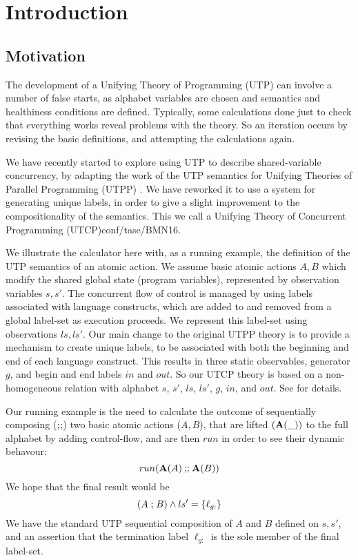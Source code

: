 \section{Introduction}\label{sec:Intro}

\subsection{Motivation}

The development of a Unifying Theory of Programming (UTP)
can involve a number of false starts,
as alphabet variables are chosen
and semantics and healthiness conditions are defined.
Typically, some calculations done just to check that everything
works reveal problems with the theory.
So an iteration occurs by revising the basic definitions,
and attempting the calculations again.

We have recently started to explore using UTP
to describe shared-variable concurrency,
by adapting the work of the  UTP semantics for Unifying Theories
of Parallel Programming (UTPP) \cite{DBLP:conf/icfem/WoodcockH02}.
We have reworked it to use a system for generating unique labels,
in order to give a slight improvement to the compositionality
of the semantics. This we call a Unifying Theory of Concurrent Programming (UTCP){conf/tase/BMN16}.

We illustrate the calculator here
with, as a running example,
the definition of the UTP semantics of an atomic action.
We assume basic atomic actions $A,B$ which modify the
shared global state (program variables), represented by observation variables $s,s'$.
The concurrent flow of control is managed by using labels
associated with language constructs, which are added to and removed
from a global label-set as execution proceeds.
We represent this label-set using observations $ls,ls'$.
Our main change to the original UTPP theory
is to provide a mechanism to create unique labels,
to be associated with both the beginning and end of each language
construct. This results in three static observables, generator $g$,
and begin and end labels $in$ and $out$.
So our UTCP theory is based on a non-homogeneous relation
with alphabet $s$, $s'$, $ls$, $ls'$, $g$, $in$, and $out$.
See \cite{conf/tase/BMN16} for details.

Our running example is the need to calculate the outcome
of sequentially composing ($\mathbin{\mathbf{;\!;}}$)
two basic atomic actions ($A,B$),
that are lifted $(\mathbf{A}(\_))$ to the full alphabet by adding control-flow,
and are then $run$ in order to see their dynamic behavour:
\[
  run(\mathbf{A}(A) \mathbin{\mathbf{;\!;}} \mathbf{A}(B))
\]
We hope that the final result would be
\[
  (A \mathrel{;} B) \land ls' = \{{\ell_{g:}}\}
\]
We have the standard UTP sequential composition of $A$ and $B$ defined on $s,s'$,
and an assertion that the termination label $\ell_{g:}$ is the sole member of the final label-set.

